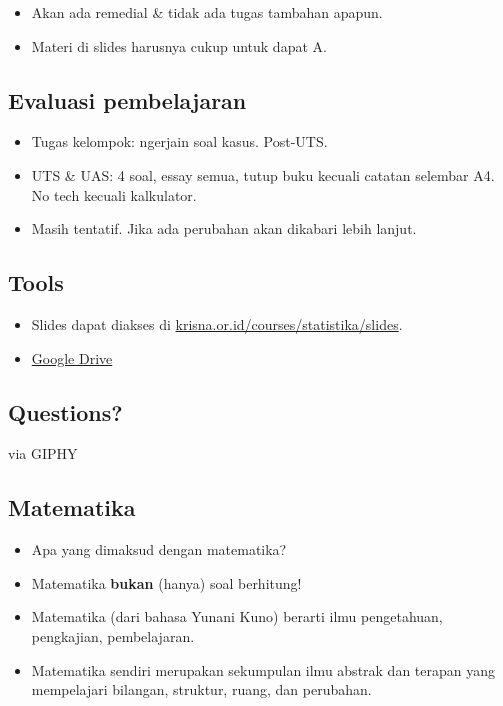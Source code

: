\documentclass[
  letterpaper,
  DIV=11,
  numbers=noendperiod]{scrartcl}
\providecommand{\tightlist}{%
  \setlength{\itemsep}{0pt}\setlength{\parskip}{0pt}}\usepackage{longtable,booktabs,array}
\begin{document}
\begin{itemize}
\tightlist
\item
  Akan ada remedial \& tidak ada tugas tambahan apapun.
\item
  Materi di slides harusnya cukup untuk dapat A.
\end{itemize}

\hypertarget{evaluasi-pembelajaran-1}{%
\subsection{Evaluasi pembelajaran}\label{evaluasi-pembelajaran-1}}

\begin{itemize}
\item
  Tugas kelompok: ngerjain soal kasus. Post-UTS.
\item
  UTS \& UAS: 4 soal, essay semua, tutup buku kecuali catatan selembar
  A4. No tech kecuali kalkulator.
\item
  Masih tentatif. Jika ada perubahan akan dikabari lebih lanjut.
\end{itemize}

\hypertarget{tools}{%
\subsection{Tools}\label{tools}}

\begin{itemize}
\item
  Slides dapat diakses di
  \href{https://www.krisna.or.id/courses/statistika/slides}{krisna.or.id/courses/statistika/slides}.
\item
  \href{https://drive.google.com/drive/folders/1s8YHrlTFrp-Iu0ip6FesyKahNHLo5had?usp=sharing}{Google
  Drive}
\end{itemize}

\hypertarget{questions}{%
\subsection{Questions?}\label{questions}}

via GIPHY

\hypertarget{matematika}{%
\subsection{Matematika}\label{matematika}}

\begin{itemize}
\item
  Apa yang dimaksud dengan matematika?
\item
  Matematika \textbf{bukan} (hanya) soal berhitung!
\item
  Matematika (dari bahasa Yunani Kuno) berarti ilmu pengetahuan,
  pengkajian, pembelajaran.
\item
  Matematika sendiri merupakan sekumpulan ilmu abstrak dan terapan yang
  mempelajari bilangan, struktur, ruang, dan perubahan.
\end{itemize}
\end{document}
